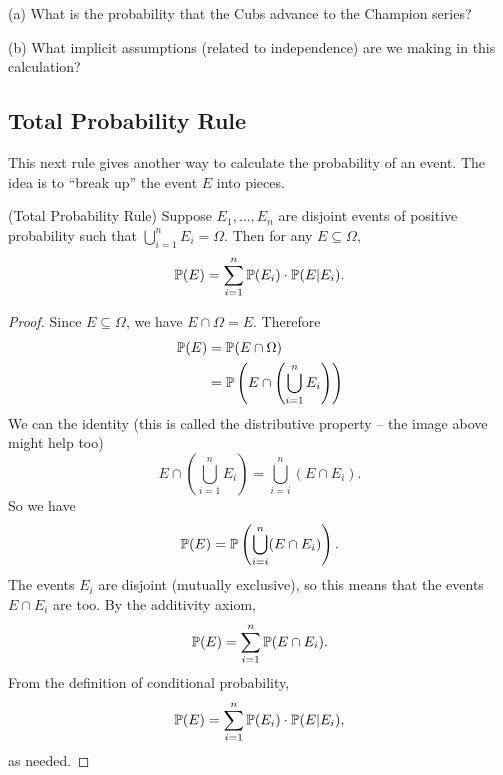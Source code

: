\documentclass{ximera}
\begin{document}
(a) What is the probability that the Cubs advance to the Champion series?

(b) What implicit assumptions (related to independence) are we making in this calculation?


\subsection{Total Probability Rule}
This next rule gives another way to calculate the probability of an event. The idea is to ``break up'' the event $E$ into pieces.

\begin{center}
\end{center}


\begin{theorem} (Total Probability Rule)
Suppose $E_1,\ldots,E_n$ are disjoint events of positive probability such that $\bigcup_{i=1}^n E_i = \Omega$. Then for any $E\subseteq \Omega$, 
$$
\mathbb{P}(E) = \sum_{i=1}^n \mathbb{P}(E_i) \cdot \mathbb{P}(E \vert E_i).
$$

\end{theorem}
\begin{proof}
Since $E\subseteq \Omega$, we have $E\cap \Omega = E$. Therefore
\begin{align*}
\mathbb{P}(E) &= \mathbb{P}(E \cap \Omega) \\
&= \mathbb{P}\left( E \cap \left(\bigcup_{i=1}^n E_i \right)\right)
\end{align*}
We can the identity (this is called the distributive property -- the image above might help too)
$$
E \cap \left(\bigcup_{i=1}^n E_i \right) = \bigcup_{i=i}^n (E\cap E_i).
$$
So we have
$$
\mathbb{P}(E) = \mathbb{P}\left( \bigcup_{i=i}^n (E\cap E_i)\right).
$$
The events $E_i$ are disjoint (mutually exclusive), so this means that the events $E\cap E_i$ are too. By the additivity axiom,
$$
\mathbb{P}(E) = \sum_{i=1}^n \mathbb{P}(E\cap E_i).
$$
From the definition of conditional probability,
$$
\mathbb{P}(E) = \sum_{i=1}^n \mathbb{P}(E_i) \cdot \mathbb{P}(E \vert E_i),
$$
as needed.






\end{proof}
\end{document}
